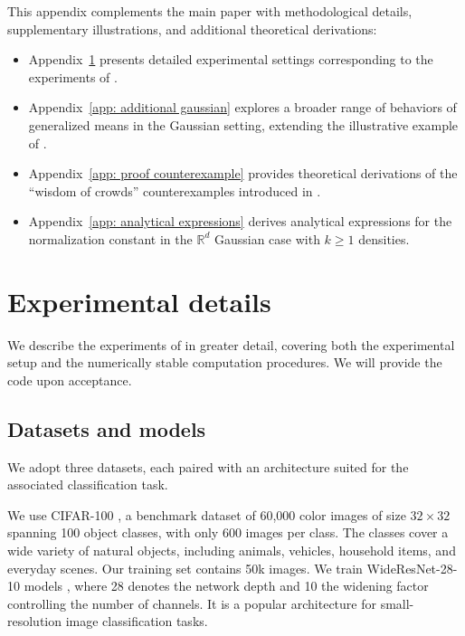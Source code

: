 \documentclass[accepted]{uai2026} %
\newcommand{\R}{\mathbb{R}}
\begin{document}
\appendix

This appendix complements the main paper with methodological details, supplementary illustrations, and additional theoretical derivations:
\begin{itemize}
    \item Appendix~\ref{app:experimental details} presents detailed experimental settings corresponding to the experiments of .
    
    \item Appendix~\ref{app: additional gaussian} explores a broader range of behaviors of generalized means in the Gaussian setting, extending the illustrative example of .
    
    \item Appendix~\ref{app: proof counterexample} provides theoretical derivations of the ``wisdom of crowds'' counterexamples introduced in .
    
    \item Appendix~\ref{app: analytical expressions} derives analytical expressions for the normalization constant in the $\R^d$ Gaussian case with $k \geq 1$ densities.
\end{itemize}

\section{Experimental details}\label{app:experimental details}

We describe the experiments of  in greater detail, covering both the experimental setup and the numerically stable computation procedures. We will provide the code upon acceptance.

\subsection{Datasets and models}

We adopt three datasets, each paired with an architecture suited for the associated classification task.

We use CIFAR-100 \citep{krizhevsky2009learning}, a benchmark dataset of 60,000 color images of size $32\times32$ spanning 100 object classes, with only 600 images per class. The classes cover a wide variety of natural objects, including animals, vehicles, household items, and everyday scenes. Our training set contains 50k images. We train WideResNet-28-10 models \citep{zagoruyko2016wide}, where 28 denotes the network depth and 10 the widening factor controlling the number of channels. It is a popular architecture for small-resolution image classification tasks.
\end{document}

